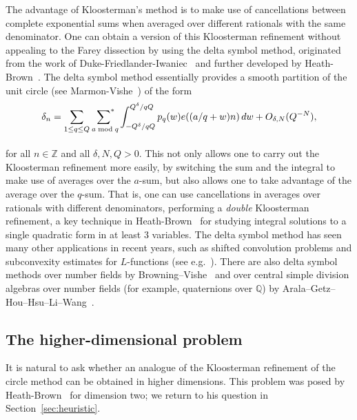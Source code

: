 \documentclass[letterpaper,11pt]{amsart}
\numberwithin{equation}{section}
\theoremstyle{definition}
\numberwithin{equation}{section}
\newcommand{\ZZ}{\mathbb{Z}}
\newcommand{\QQ}{\mathbb{Q}}
\newcommand{\starsum}{\sideset{}{^*}\sum}
\begin{document}
The advantage of Kloosterman's method is to make use of cancellations between complete exponential sums when averaged over different rationals with the same denominator. One can obtain a version of this Kloosterman refinement without appealing to the Farey dissection by using the delta symbol method, originated from the work of Duke-Friedlander-Iwaniec~\cite{DFI} and further developed by Heath-Brown~\cite{Heath-Brown96}. 
The delta symbol method essentially 
 provides a smooth partition of the unit circle (see Marmon-Vishe~\cite[Proposition 1.2]{Marmon_Vishe}) of the form 
 \begin{equation}
     \label{Marmon_Vishe}
 			\delta_{n}
			=
			\sum_{1\leq q\leq Q}
			\underset{\hphantom{a\bmod{q}}}{\starsum_{\ a\bmod{q}}}			
			\int_{-Q^\delta/qQ}^{Q^\delta/qQ}
			p_{q}(w)
			e((a/q+w)n)\,dw
			+O_{\delta,N}(Q^{-N}),
 \end{equation}
 for all \(n\in\ZZ\) and all \(\delta,N,Q>0\).
 This not only allows one to carry out the Kloosterman refinement more easily, by switching the sum and the integral to make use of averages over the $a$-sum, but also allows one to take advantage of the average over the \(q\)-sum. That is, one can use cancellations in averages over rationals with different denominators, performing a \emph{double} Kloosterman refinement, a key technique in Heath-Brown~\cite{Heath-Brown96} for studying integral solutions to a single quadratic form in at least $3$ variables. The delta symbol method has seen many other applications in recent years, such as shifted convolution problems and subconvexity estimates for $L$-functions (see e.g.~\cite{Munshi0, Munshi1, Munshi2, Munshi3}). There are also delta symbol methods over number fields by Browning--Vishe~\cite{BV} and over central simple division algebras over number fields (for example, quaternions over $\QQ$) by Arala--Getz--Hou--Hsu--Li--Wang~\cite{AGHHLW}.
 
\subsection{The higher-dimensional problem}\label{sec:higher}

It is natural to ask whether an analogue of the Kloosterman refinement of the circle method can be obtained in higher dimensions. This problem was posed by Heath-Brown~\cite{Heath-Brown96} for dimension two; we return to his question in Section~\ref{sec:heuristic}.
\end{document}
